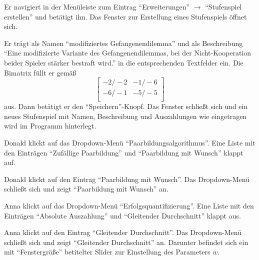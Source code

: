 \documentclass[parskip=full,11pt]{scrartcl}
\begin{document}
{Er navigiert in der Menüleiste zum Eintrag \enquote{Erweiterungen} \(\rightarrow\) \enquote{Stufenspiel erstellen} und betätigt ihn.}
{Das Fenster zur Erstellung eines Stufenspiels öffnet sich.}

{Er trägt als Namen \enquote{modifiziertes Gefangenendilemma} und als Beschreibung \enquote{Eine modifizierte Variante des Gefangenendilemmas, bei der Nicht-Kooperation beider Spieler stärker bestraft wird.} in die entsprechenden Textfelder ein. Die Bimatrix füllt er gemäß
\[
\left[ \begin{array}{rr}
-2 / -2 & -1 / -6 \\
-6 / -1 & -5 / -5 \\
\end{array}\right]
\]
aus. Dann betätigt er den \enquote{Speichern}-Knopf.}
{Das Fenster schließt sich und ein neues Stufenspiel mit Namen, Beschreibung und Auszahlungen wie eingetragen wird im Programm hinterlegt.}


{Donald klickt auf das Dropdown-Menü \enquote{Paarbildungsalgorithmus}.}
{Eine Liste mit den Einträgen \enquote{Zufällige Paarbildung} und \enquote{Paarbildung mit Wunsch} klappt auf.}

{Donald klickt auf den Eintrag \enquote{Paarbildung mit Wunsch}.}
{Das Dropdown-Menü schließt sich und zeigt \enquote{Paarbildung mit Wunsch} an.}


{Anna klickt auf das Dropdown-Menü \enquote{Erfolgsquantifizierung}.}
{Eine Liste mit den Einträgen \enquote{Absolute Auszahlung} und  \enquote{Gleitender Durchschnitt} klappt aus.}

{Anna klickt auf den Eintrag \enquote{Gleitender Durchschnitt}.}
{Das Dropdown-Menü schließt sich und zeigt \enquote{Gleitender Durchschnitt} an. Darunter befindet sich ein mit \enquote{Fenstergröße} betitelter Slider zur Einstellung des Parameters \(w\).}
\end{document}
